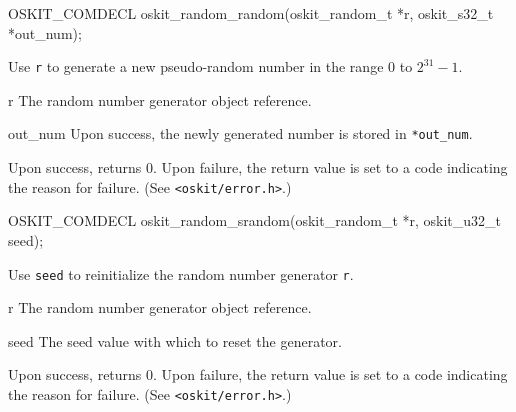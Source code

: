 \begin{apisyn}

	\funcproto OSKIT_COMDECL
	oskit_random_random(oskit_random_t *r, \outparam oskit_s32_t *out_num);
\end{apisyn}
\begin{apidesc}
	Use \texttt{r} to generate a new pseudo-random number in the range $0$
	to $2^{31}-1$.
\end{apidesc}
\begin{apiparm}
	\item[r]
		The random number generator object reference.
	\item[out_num]
		Upon success, the newly generated number is stored in
		\texttt{*out_num}.
\end{apiparm}
\begin{apiret}
	Upon success, returns 0.  Upon failure, the return value is set to a
	code indicating the reason for failure.  (See {\tt <oskit/error.h>}.)
\end{apiret}

\begin{apisyn}

	\funcproto OSKIT_COMDECL
	oskit_random_srandom(oskit_random_t *r, oskit_u32_t seed);
\end{apisyn}
\begin{apidesc}
	Use \texttt{seed} to reinitialize the random number generator
	\texttt{r}.
\end{apidesc}
\begin{apiparm}
	\item[r]
		The random number generator object reference.
	\item[seed]
		The seed value with which to reset the generator.
\end{apiparm}
\begin{apiret}
	Upon success, returns 0.  Upon failure, the return value is set to a
	code indicating the reason for failure.  (See {\tt <oskit/error.h>}.)
\end{apiret}

